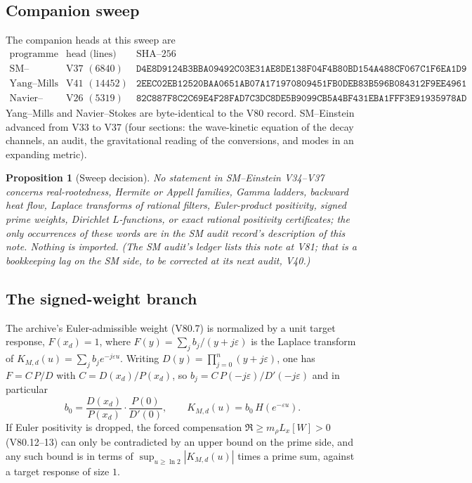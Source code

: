 \documentclass[11pt]{article}
\newtheorem{proposition}[theorem]{Proposition}
\theoremstyle{definition}
\theoremstyle{remark}
\begin{document}
\subsection{Companion sweep}

The companion heads at this sweep are
\begin{equation}
\begin{array}{l|c|c}
 \text{programme} & \text{head (lines)} & \text{SHA--256}\\ \hline
 \text{SM--Einstein} & \text{V37 } (6840) & \texttt{D4E8D9124B3BBA09492C03E31AE8DE13}\allowbreak\texttt{8F04F4B80BD154A488CF067C1F6EA1D9}\\
 \text{Yang--Mills} & \text{V41 } (14452) & \texttt{2EEC02EB12520BAA0651AB07A1719708}\allowbreak\texttt{09451FB0DEB83B596B084312F9EE4961}\\
 \text{Navier--Stokes} & \text{V26 } (5319) & \texttt{82C887F8C2C69E4F28FAD7C3DC8DE5B9}\allowbreak\texttt{099CB5A4BF431EBA1FFF3E91935978AD}
\end{array}
\label{eq:f2v85-sources}
\end{equation}
Yang--Mills and Navier--Stokes are byte-identical to the V80 record.
SM--Einstein advanced from V33 to V37 (four sections: the wave-kinetic
equation of the decay channels, an audit, the gravitational reading of
the conversions, and modes in an expanding metric).

\begin{proposition}[Sweep decision]
\label{prop:f2v85-sweep}
No statement in SM--Einstein V34--V37 concerns real-rootedness, Hermite
or Appell families, Gamma ladders, backward heat flow, Laplace transforms
of rational filters, Euler-product positivity, signed prime weights,
Dirichlet \(L\)-functions, or exact rational positivity certificates;
the only occurrences of these words are in the SM audit record's
description of this note.  Nothing is imported.  (The SM audit's ledger
lists this note at V81; that is a bookkeeping lag on the SM side, to be
corrected at its next audit, V40.)
\end{proposition}

\subsection{The signed-weight branch}

The archive's Euler-admissible weight (V80.7) is normalized by a unit
target response, \(F(x_d)=1\), where \(F(y)=\sum_jb_j/(y+j\varepsilon)\)
is the Laplace transform of \(K_{M,d}(u)=\sum_jb_je^{-j\varepsilon u}\).
Writing \(D(y)=\prod_{j=0}^n(y+j\varepsilon)\), one has
\(F=C\,P/D\) with \(C=D(x_d)/P(x_d)\), so
\(b_j=C\,P(-j\varepsilon)/D'(-j\varepsilon)\) and in particular
\begin{equation}
 b_0=\frac{D(x_d)}{P(x_d)}\cdot\frac{P(0)}{D'(0)},\qquad
 K_{M,d}(u)=b_0\,H(e^{-\varepsilon u}).
\label{eq:f2v85-b0}
\end{equation}
If Euler positivity is dropped, the forced compensation
\(\Re\ge m_\rho L_x[W]>0\) (V80.12--13) can only be contradicted by an
upper bound on the prime side, and any such bound is in terms of
\(\sup_{u\ge\ln2}|K_{M,d}(u)|\) times a prime sum, against a target
response of size \(1\).
\end{document}
